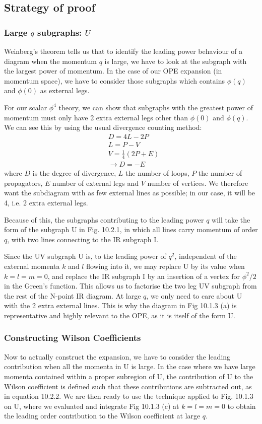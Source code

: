 \documentclass{scrartcl}
\begin{document}
\subsection{Strategy of proof}
\subsubsection{Large $q$ subgraphs: $U$}
Weinberg's theorem tells us that to identify the leading power behaviour of a diagram when the momentum $q$ is large, we have to look at the subgraph with the largest power of momentum. In the case of our OPE expansion (in momentum space), we have to consider those subgraphs which contains $\phi(q)$ and $\phi(0)$ as external legs. 

For our scalar $\phi^4$ theory, we can show that subgraphs with the greatest power of momentum must only have 2 extra external legs other than $\phi(0)$ and $\phi(q)$. We can see this by using the usual divergence counting method:
\begin{equation}
\begin{split}
    &D=4L-2P\\
    &L=P-V\\
    &V=\frac{1}{4}(2P+E)\\
    &\rightarrow D=-E
\end{split}
\end{equation}
where $D$ is the degree of divergence, $L$ the number of loops, $P$ the number of propagators, $E$ number of external legs and $V$ number of vertices. We therefore want the subdiagram with as few external lines as possible; in our case, it will be 4, i.e. 2 extra external legs. 

Because of this, the subgraphs contributing to the leading power $q$ will take the form of the subgraph U in Fig. 10.2.1, in which all lines carry momentum of order $q$, with two lines connecting to the IR subgraph I. 

Since the UV subgraph U is, to the leading power of $q^2$, independent of the external momenta $k$ and $l$ flowing into it, we may replace U by its value when $k=l=m=0$, and replace the IR subgraph I by an insertion of a vertex for $\phi^2/2$ in the Green's function. This allows us to factorise the two leg UV subgraph from the rest of the N-point IR diagram. At large $q$, we only need to care about U with the 2 extra external lines. This is why the diagram in Fig 10.1.3 (a) is representative and highly relevant to the OPE, as it is itself of the form U.

\subsubsection{Constructing Wilson Coefficients}
Now to actually construct the expansion, we have to consider the leading contribution when all the momenta in U is large. In the case where we have large momenta contained within a proper subregion of U, the contribution of U to the Wilson coefficient is defined such that these contributions are subtracted out, as in equation 10.2.2. We are then ready to use the technique applied to Fig. 10.1.3 on U, where we evaluated and integrate Fig 10.1.3 (c) at $k=l=m=0$ to obtain the leading order contribution to the Wilson coefficient at large $q$. 
\end{document}
